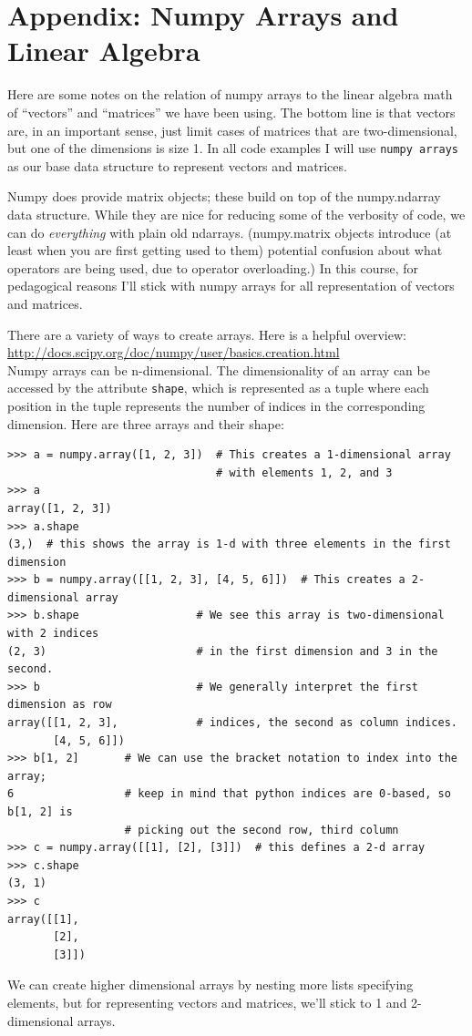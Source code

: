 \documentclass[10pt]{article}
\begin{document}
\newpage
\section*{Appendix: Numpy Arrays and Linear Algebra}

Here are some notes on the relation of numpy arrays to the linear algebra math of ``vectors'' and ``matrices'' we have been using.  The bottom line is that vectors are, in an important sense, just limit cases of matrices that are two-dimensional, but one of the dimensions is size 1.  In all code examples I will use {\tt numpy arrays} as our base data structure to represent vectors and matrices.

Numpy does provide matrix objects; these build on top of the numpy.ndarray data structure.  While they are nice for reducing some of the verbosity of code, we can do {\em everything} with plain old ndarrays.  (numpy.matrix objects introduce (at least when you are first getting used to them) potential confusion about what operators are being used, due to operator overloading.)  In this course, for pedagogical reasons I'll stick with numpy arrays for all representation of vectors and matrices.

There are a variety of ways to create arrays. Here is a helpful overview: \\
\url{http://docs.scipy.org/doc/numpy/user/basics.creation.html} \\
Numpy arrays can be n-dimensional.  The dimensionality of an array can be accessed by the attribute {\tt shape}, which is represented as a tuple where each position in the tuple represents the number of indices in the corresponding dimension.  Here are three arrays and their shape:
\begin{verbatim}
>>> a = numpy.array([1, 2, 3])  # This creates a 1-dimensional array
                                # with elements 1, 2, and 3
>>> a
array([1, 2, 3]) 
>>> a.shape
(3,)  # this shows the array is 1-d with three elements in the first dimension
>>> b = numpy.array([[1, 2, 3], [4, 5, 6]])  # This creates a 2-dimensional array
>>> b.shape                  # We see this array is two-dimensional with 2 indices 
(2, 3)                       # in the first dimension and 3 in the second.
>>> b                        # We generally interpret the first dimension as row  
array([[1, 2, 3],            # indices, the second as column indices.
       [4, 5, 6]])
>>> b[1, 2]       # We can use the bracket notation to index into the array;
6                 # keep in mind that python indices are 0-based, so b[1, 2] is
                  # picking out the second row, third column
>>> c = numpy.array([[1], [2], [3]])  # this defines a 2-d array
>>> c.shape
(3, 1)
>>> c
array([[1],
       [2],
       [3]])
\end{verbatim}
We can create higher dimensional arrays by nesting more lists specifying elements, but for representing vectors and matrices, we'll stick to 1 and 2-dimensional arrays.  
\end{document}

